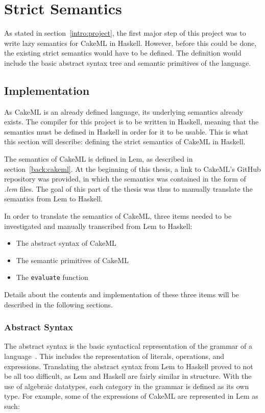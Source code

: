 \chapter{Strict Semantics}
\label{chapter:strict}
As stated in section~\ref{intro:project}, the first major step of this project
was to write lazy semantics for CakeML in Haskell. However, before this could be
done, the existing strict semantics would have to be defined. The definition
would include the basic abstract syntax tree and semantic primitives of the
language.

\section{Implementation}
As CakeML is an already defined language, its underlying semantics already
exists. The compiler for this project is to be written in Haskell, meaning that
the semantics must be defined in Haskell in order for it to be usable. This is
what this section will describe: defining the strict semantics of CakeML in
Haskell.

The semantics of CakeML is defined in Lem, as described in
section~\ref{back:cakeml}. At the beginning of this thesis, a link to CakeML's
GitHub repository was provided, in which the semantics was contained in the form
of \textit{.lem} files. The goal of this part of the thesis was thus to manually
translate the semantics from Lem to Haskell. 

In order to translate the semantics of CakeML, three items needed to be
investigated and manually transcribed from Lem to Haskell:
\begin{itemize}
\item The abstract syntax of CakeML
\item The semantic primitives of CakeML
\item The \texttt{evaluate} function
\end{itemize}

\noindent Details about the contents and implementation of these three items
will be described in the following sections.

\subsection{Abstract Syntax}
\label{strict:abs}
The abstract syntax is the basic syntactical representation of the grammar of a
language~\cite{pltbook}. This includes the representation of literals,
operations, and expressions. Translating the abstract syntax from Lem to Haskell
proved to not be all too difficult, as Lem and Haskell are fairly similar in
structure. With the use of algebraic datatypes, each category in the grammar is
defined as its own type. For example, some of the expressions of CakeML
are represented in Lem as such:

